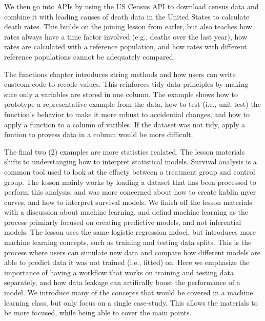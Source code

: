 \documentclass[030-workshop.tex]{subfiles}
\begin{document}
            We then go into APIs by using the US Census API to download census data and combine it with
            leading causes of death data in the United States to calculate death rates.
            This builds on the joining lesson from earler,
            but also teaches how rates always have a time factor involved (e.g., deaths over the last year),
            how rates are calculated with a reference population,
            and how rates with different reference populations cannot be adequately compared.

            The functions chapter introduces string methods and how users can write custeom code to
            recode values.
            This reinforces tidy data principles by making sure only a variables are stored in one column.
            The example shows how to prototype a representative example from the data,
            how to test (i.e., unit test) the function's behavior to make it more robust to accidential changes,
            and how to apply a function to a column of varibles.
            If the dataset was not tidy,
            apply a funtion to provess data in a column would be more difficult.

            The final two (2) examples are more statistics realated.
            The lesson materials shifts to understanging how to interpret statistical models.
            Survival analysis is a common tool used to look at the effacty between a treatment group and control group.
            The lesson mainly works by loading a dataset that has been processed to perform this analysis,
            and was more concerned about how to create kablin myer curves, and how to interpret survival models.
            We finish off the lesson materials with a discussion about machine learning,
            and defind machine learning as the process primiarly focused on creating predictive models,
            and not inferential models.
            The lesson uses the same logistic regression mdoel,
            but introduces more machine learning concepts, such as training and testing data splits.
            This is the process where users can simulate new data and compare how different models are able to predict data it was not trained (i.e., fitted) on.
            Here we emphasize the importance of having a workflow that works on training and testing data separately,
            and how data leakage can artifically boost the performance of a model.
            We introduce many of the concepts that would be covered in a machine learning class,
            but only focus on a single case-study.
            This allows the materials to be more focused,
            while being able to cover the main points.
\end{document}
